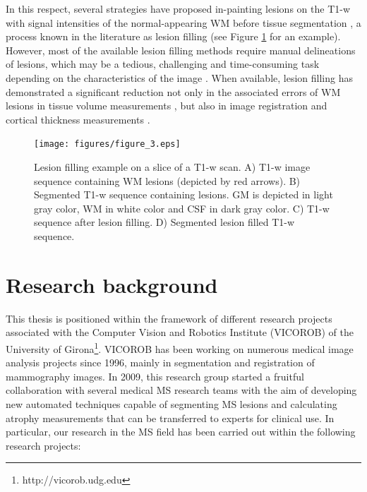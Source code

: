 In this respect, several strategies have proposed in-painting lesions on the T1-w with signal intensities of the normal-appearing WM before tissue segmentation \cite{Battaglini2012, Chard2010, Magon2014, Sdika2009}, a process known in the literature as lesion filling (see Figure \ref{lesion_filling} for an example). However, most of the available lesion filling methods require manual delineations of lesions, which may be a tedious, challenging and time-consuming task depending on the characteristics of the image \cite{Llado2012}. When available, lesion filling has demonstrated  a significant reduction not only in the associated errors of WM lesions in tissue volume measurements \cite{Popescu2014}, but also in image registration \cite{Ceccarelli2012,  Diez2014, Sdika2009} and cortical thickness measurements \cite{Magon2014}. 

\begin{figure}[top]
  \begin{center}
    \texttt{[image: figures/figure\_3.eps]}
  \end{center}
    \caption[Lesion filling example on a T1-w sequence]{Lesion filling example on a slice of a T1-w scan. A) T1-w image sequence containing WM lesions (depicted by red arrows). B) Segmented T1-w sequence containing lesions. GM is depicted in light gray color, WM in white color and CSF in dark gray color.  C) T1-w sequence after lesion filling. D) Segmented lesion filled T1-w sequence.}
    \label{lesion_filling}
\end{figure}

\section{Research background}
\label{sec:research_background}

This thesis is positioned  within the framework of different research projects associated with the Computer Vision and Robotics Institute (VICOROB) of the University of Girona\footnote{http://vicorob.udg.edu}. VICOROB has been working on numerous medical image analysis projects since 1996, mainly in segmentation and registration of mammography images. In 2009, this research group started a fruitful collaboration with several medical MS research teams with the aim of developing new automated techniques capable of segmenting MS lesions and calculating atrophy measurements that can be transferred to experts for clinical use. In particular, our research in the MS field has been carried out within the following research projects:

